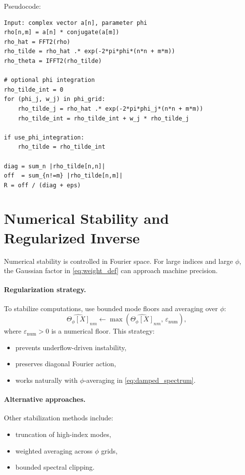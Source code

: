 \documentclass[11pt]{article}
\begin{document}
\noindent Pseudocode:
\begin{verbatim}
Input: complex vector a[n], parameter phi
rho[n,m] = a[n] * conjugate(a[m])
rho_hat = FFT2(rho)
rho_tilde = rho_hat .* exp(-2*pi*phi*(n*n + m*m))
rho_theta = IFFT2(rho_tilde)

# optional phi integration
rho_tilde_int = 0
for (phi_j, w_j) in phi_grid:
    rho_tilde_j = rho_hat .* exp(-2*pi*phi_j*(n*n + m*m))
    rho_tilde_int = rho_tilde_int + w_j * rho_tilde_j

if use_phi_integration:
    rho_tilde = rho_tilde_int

diag = sum_n |rho_tilde[n,n]|
off  = sum_{n!=m} |rho_tilde[n,m]|
R = off / (diag + eps)
\end{verbatim}

\section{Numerical Stability and Regularized Inverse}
Numerical stability is controlled in Fourier space. For large indices and large $\phi$, the Gaussian factor in \eqref{eq:weight_def} can approach machine precision.

\paragraph{Regularization strategy.}
To stabilize computations, use bounded mode floors and averaging over $\phi$:
\begin{equation}
\widehat{\Theta_{\phi}[X]}_{nm} \leftarrow \max\!\left(\widehat{\Theta_{\phi}[X]}_{nm},\,\varepsilon_{\mathrm{num}}\right),
\label{eq:regularized_inverse}
\end{equation}
where $\varepsilon_{\mathrm{num}}>0$ is a numerical floor. This strategy:
\begin{itemize}
    \item prevents underflow-driven instability,
    \item preserves diagonal Fourier action,
    \item works naturally with $\phi$-averaging in \eqref{eq:damped_spectrum}.
\end{itemize}

\paragraph{Alternative approaches.}
Other stabilization methods include:
\begin{itemize}
    \item truncation of high-index modes,
    \item weighted averaging across $\phi$ grids,
    \item bounded spectral clipping.
\end{itemize}
\end{document}
